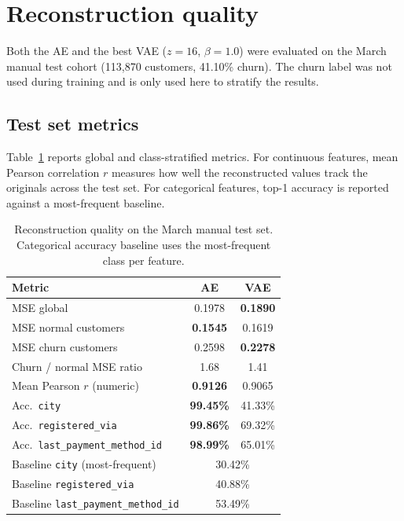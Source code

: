 \documentclass{article}
\begin{document}
\section{Reconstruction quality}

Both the AE and the best VAE ($z{=}16$, $\beta{=}1.0$) were evaluated on the March
manual test cohort (113{,}870 customers, 41.10\% churn). The churn label was not
used during training and is only used here to stratify the results.

\subsection{Test set metrics}

Table~\ref{tab:recon_summary} reports global and class-stratified metrics. For continuous
features, mean Pearson correlation $r$ measures how well the reconstructed values track
the originals across the test set. For categorical features, top-1 accuracy is reported
against a most-frequent baseline.

\begin{table}[H]
    \centering
    \caption{Reconstruction quality on the March manual test set. Categorical accuracy
             baseline uses the most-frequent class per feature.}
    \label{tab:recon_summary}
    \begin{tabular}{lcc}
        \toprule
        \textbf{Metric} & \textbf{AE} & \textbf{VAE} \\
        \midrule
        MSE global                      & 0.1978 & \textbf{0.1890} \\
        MSE normal customers            & \textbf{0.1545} & 0.1619 \\
        MSE churn customers             & 0.2598 & \textbf{0.2278} \\
        Churn / normal MSE ratio        & 1.68   & 1.41   \\
        Mean Pearson $r$ (numeric)      & \textbf{0.9126} & 0.9065 \\
        Acc.\ \texttt{city}             & \textbf{99.45\%} & 41.33\% \\
        Acc.\ \texttt{registered\_via}  & \textbf{99.86\%} & 69.32\% \\
        Acc.\ \texttt{last\_payment\_method\_id} & \textbf{98.99\%} & 65.01\% \\
        \midrule
        Baseline \texttt{city} (most-frequent)  & \multicolumn{2}{c}{30.42\%} \\
        Baseline \texttt{registered\_via}       & \multicolumn{2}{c}{40.88\%} \\
        Baseline \texttt{last\_payment\_method\_id} & \multicolumn{2}{c}{53.49\%} \\
        \bottomrule
    \end{tabular}
\end{table}
\end{document}
